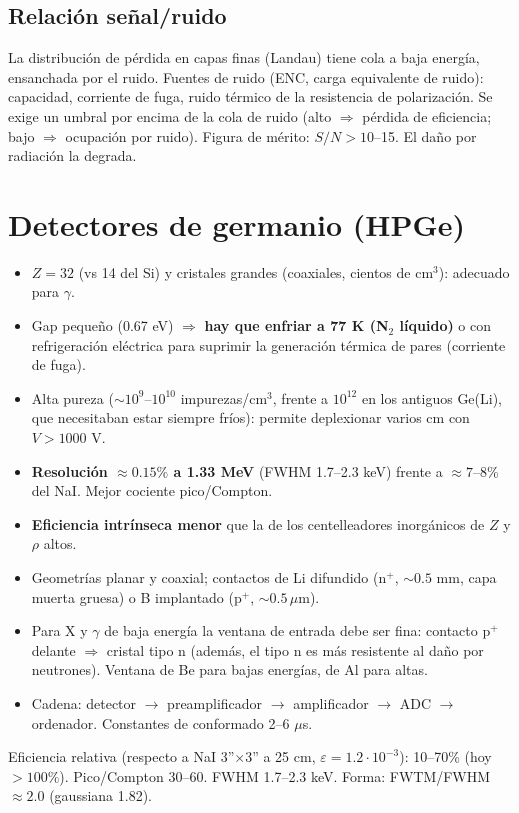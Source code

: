 \subsection{Relación señal/ruido}
La distribución de pérdida en capas finas (Landau) tiene cola a baja energía, ensanchada por el ruido. Fuentes de ruido
(ENC, carga equivalente de ruido): capacidad, corriente de fuga, ruido térmico de la resistencia de polarización.
Se exige un umbral por encima de la cola de ruido (alto $\Rightarrow$ pérdida de eficiencia; bajo $\Rightarrow$ ocupación por ruido).
Figura de mérito: $S/N>10$--15. El daño por radiación la degrada.

\section{Detectores de germanio (HPGe)}
\begin{clave}
\begin{itemize}
\item $Z=32$ (vs 14 del Si) y cristales grandes (coaxiales, cientos de cm$^3$): adecuado para $\gamma$.
\item Gap pequeño (0.67 eV) $\Rightarrow$ \textbf{hay que enfriar a 77 K (N$_2$ líquido)} o con refrigeración eléctrica para suprimir la
generación térmica de pares (corriente de fuga).
\item Alta pureza ($\sim10^{9}$--$10^{10}$ impurezas/cm$^3$, frente a $10^{12}$ en los antiguos Ge(Li), que necesitaban estar siempre fríos):
permite deplexionar varios cm con $V>1000$ V.
\item \textbf{Resolución $\approx0.15\%$ a 1.33 MeV} (FWHM 1.7--2.3 keV) frente a $\approx7$--8\% del NaI. Mejor cociente pico/Compton.
\item \textbf{Eficiencia intrínseca menor} que la de los centelleadores inorgánicos de $Z$ y $\rho$ altos.
\end{itemize}
\end{clave}
\begin{itemize}
\item Geometrías planar y coaxial; contactos de Li difundido (n$^+$, $\sim0.5$ mm, capa muerta gruesa) o B implantado (p$^+$, $\sim0.5\,\mu$m).
\item Para X y $\gamma$ de baja energía la ventana de entrada debe ser fina: contacto p$^+$ delante $\Rightarrow$ cristal tipo n
(además, el tipo n es más resistente al daño por neutrones). Ventana de Be para bajas energías, de Al para altas.
\item Cadena: detector $\to$ preamplificador $\to$ amplificador $\to$ ADC $\to$ ordenador. Constantes de conformado 2--6 $\mu$s.
\end{itemize}
\begin{dato}
Eficiencia relativa (respecto a NaI 3''$\times$3'' a 25 cm, $\varepsilon=1.2\cdot10^{-3}$): 10--70\% (hoy $>100\%$).
Pico/Compton 30--60. FWHM 1.7--2.3 keV. Forma: FWTM/FWHM $\approx2.0$ (gaussiana 1.82).
\end{dato}

